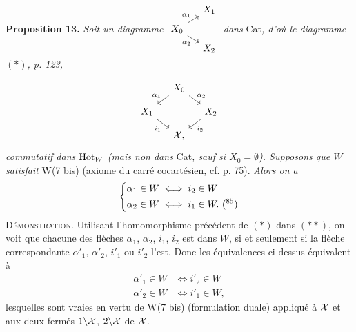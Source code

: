 \textbf{Proposition 13.} \textit{Soit un diagramme} $\begin{tikzcd}[column sep=small, row sep=tiny, ampersand replacement=\&, baseline=(\tikzcdmatrixname-2-1.base)]
 \& X_1 \\
X_0 \arrow[ur, "\alpha_1"] \arrow[dr, "\alpha_2"'] \& \\
 \& X_2
\end{tikzcd}$ \textit{dans} Cat\textit{, d'où le diagramme} $(*)$\textit{, p. 123,}

\[
\begin{tikzcd}[column sep=small, row sep=small, ampersand replacement=\&]
 \& X_0 \arrow[dl, "\alpha_1"'] \arrow[dr, "\alpha_2"] \& \\
X_1 \arrow[dr, "i_1"'] \& \& X_2 \arrow[dl, "i_2"] \\
 \& \cX, \&
\end{tikzcd}
\]
\textit{commutatif dans} $\mathrm{Hot}_W$ \textit{(mais non dans} Cat\textit{, sauf si $X_0 = \emptyset$). Supposons que $W$ satisfait} W(7 bis) (axiome du carré cocartésien, cf. p. 75). \textit{Alors on a}
\[
\left\{
\begin{aligned}
\alpha_1\in W &\iff i_2\in W\\
\alpha_2\in W &\iff i_1\in W. \text{ (\footnotemark[85])}
\end{aligned}
\right.
\]
\textsc{Démonstration}. Utilisant l'homomorphisme précédent de $(*)$ dans $(**)$, on voit que chacune des flèches $\alpha_1$, $\alpha_2$, $i_1$, $i_2$ est dans $W$, si et seulement si la flèche correspondante $\alpha'_1$, $\alpha'_2$, $i'_1$ ou $i'_2$ l'est. Donc les équivalences ci-dessus équivalent à
\[
\begin{aligned}
\alpha'_1\in W &\iff i'_2\in W\\
\alpha'_2\in W &\iff i'_1\in W,
\end{aligned}
\]
lesquelles sont vraies en vertu de W(7 bis) (formulation duale) appliqué à $\mathcal{X}$ et aux deux fermés $1\backslash\mathcal{X}$, $2\backslash\mathcal{X}$ de $\mathcal{X}$.

